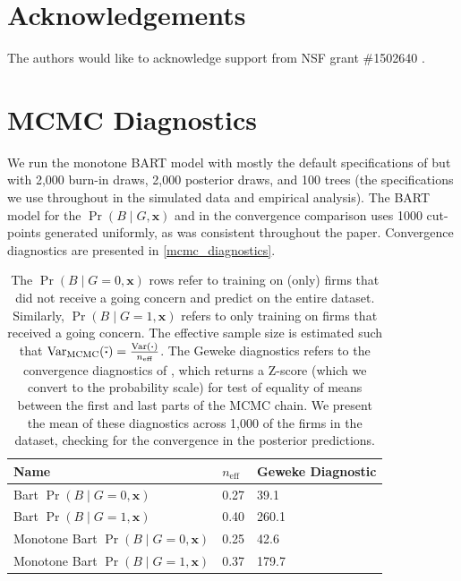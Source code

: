 \documentclass[aoas,preprint, 11pt, dvipsnames, table, x11name]{imsart}
\renewcommand{\bm}[1]{\mathbf{#1}}
\theoremstyle{remark}
\begin{document}
	\color{black}
	
	
	

	
	
	
	
	
	
	
	
	
	\section*{Acknowledgements}
	The authors would like to acknowledge support from NSF grant \#1502640 .
	
	\clearpage
	\appendix
	\section{MCMC Diagnostics}\label{appendix_mcmc}
	
	We run the monotone BART model with mostly the default specifications of \cite{bart} but with 2,000 burn-in draws, 2,000 posterior draws, and 100 trees (the specifications we use throughout in the simulated data and empirical analysis).  The BART model for the $\Pr(B\mid G,\bm{x})$ and in the convergence comparison uses 1000 cut-points generated uniformly, as was consistent throughout the paper. Convergence diagnostics are presented in \autoref{mcmc_diagnostics}.
	\begin{table}[h]
		\centering
		\begin{tabular}{lP{1cm}P{1.5cm}}
			
			\toprule
			Name&$n_{\text{eff}}$&Geweke Diagnostic\\ \midrule
			Bart $\Pr(B\mid G=0, \bm{x})$&0.27&39.1\\
			Bart $\Pr(B\mid G=1, \bm{x})$&0.40&260.1\\
			Monotone Bart $\Pr(B\mid G=0, \bm{x})$&0.25&42.6\\
			Monotone Bart $\Pr(B\mid G=1, \bm{x})$&0.37&179.7\\
			
			\bottomrule      
		\end{tabular}
		\caption{The $\Pr(B\mid G=0, \bm{x})$ rows refer to training on (only) firms that did not receive a going concern and predict on the entire dataset.  Similarly, $\Pr(B\mid G=1, \bm{x})$ refers to only training on firms that received a going concern. The effective sample size is estimated such that  $\text{Var}_{\text{MCMC}}(\overline{\vdot})=\frac{\text{Var}(\vdot )}{n_{\text{eff}}}$.  The Geweke diagnostics refers to the convergence diagnostics of \cite{geweke1992evaluating}, which returns a Z-score (which we convert to the probability scale) for test of equality of means between the first and last parts of the MCMC chain. We present the mean of these diagnostics across 1,000 of the firms in the dataset, checking for the convergence in the posterior predictions.  }
		\label{mcmc_diagnostics}
	\end{table}
\end{document}

